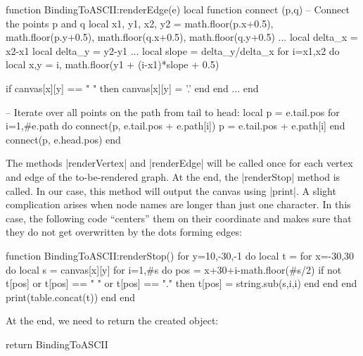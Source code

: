 \begin{codeexample}
function BindingToASCII:renderEdge(e)
  local function connect (p,q)
    -- Connect the points p and q
    local x1, y1, x2, y2 = math.floor(p.x+0.5), math.floor(p.y+0.5), math.floor(q.x+0.5), math.floor(q.y+0.5)
    ...
    local delta_x = x2-x1
    local delta_y = y2-y1
    ...
      local slope = delta_y/delta_x
      for i=x1,x2 do
        local x,y = i, math.floor(y1 + (i-x1)*slope + 0.5)
    
        if canvas[x][y] == " " then
          canvas[x][y] = '.'
        end
      end
    ...
  end
  
  -- Iterate over all points on the path from tail to head:
  local p = e.tail.pos
  for i=1,#e.path do
    connect(p, e.tail.pos + e.path[i])
    p = e.tail.pos + e.path[i]
  end  
  connect(p, e.head.pos)
end
\end{codeexample}


The methods |renderVertex| and |renderEdge| will be called once for
each vertex and edge of the to-be-rendered graph. At the end, the
|renderStop| method is called. In our case, this method will output
the canvas using |print|. A slight complication arises when node names
are longer than just one character. In this case, the following code
``centers'' them on their coordinate and makes sure that they do not
get overwritten by the dots forming edges:

\begin{codeexample}
function BindingToASCII:renderStop()
  for y=10,-30,-1 do
    local t = {}
    for x=-30,30 do
      local s = canvas[x][y]
      for i=1,#s do
        pos = x+30+i-math.floor(#s/2)
        if not t[pos] or t[pos] == " " or t[pos] == "." then
          t[pos] = string.sub(s,i,i)
        end
      end
    end
    print(table.concat(t))
  end
end
\end{codeexample}

At the end, we need to return the created object:

\begin{codeexample}
return BindingToASCII
\end{codeexample}


